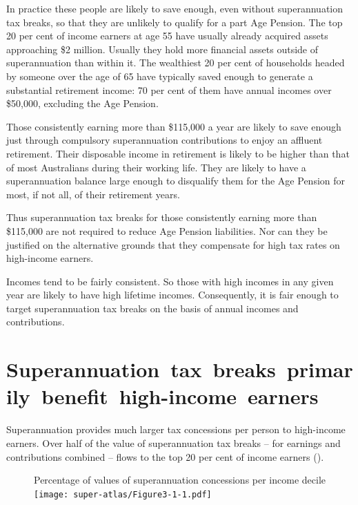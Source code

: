 In practice these people are likely to save enough, even without superannuation tax breaks, so that they are unlikely to qualify for a part Age Pension. The top 20 per cent of income earners at age 55 have usually already acquired assets approaching \$2 million. Usually they hold more financial assets outside of superannuation than within it. The wealthiest 20 per cent of households headed by someone over the age of 65 have typically saved enough to generate a substantial retirement income: 70 per cent of them have annual incomes over \$50,000, excluding the Age Pension.

Those consistently earning more than \$115,000 a year are likely to save enough just through compulsory superannuation contributions to enjoy an affluent retirement. Their disposable income in retirement is likely to be higher than that of most Australians during their working life. They are likely to have a superannuation balance large enough to disqualify them for the Age Pension for most, if not all, of their retirement years. 

Thus superannuation tax breaks for those consistently earning more than \$115,000 are not required to reduce Age Pension liabilities. Nor can they be justified on the alternative grounds that they compensate for high tax rates on high-income earners.

Incomes tend to be fairly consistent. So those with high incomes in any given year are likely to have high lifetime incomes. Consequently, it is fair enough to target superannuation tax breaks on the basis of annual incomes and contributions.

\section{\mbox{Superannuation tax breaks primarily benefit high-income earners}}
Superannuation provides much larger tax concessions per person to high-income earners. Over half of the value of superannuation tax breaks – for earnings and contributions combined – flows to the top 20 per cent of income earners ().

\begin{figure}
%
{Percentage of values of superannuation concessions per income decile}\label{fig:SUPER-3-1}
\texttt{[image: super-atlas/Figure3-1-1.pdf]}

\end{figure}

